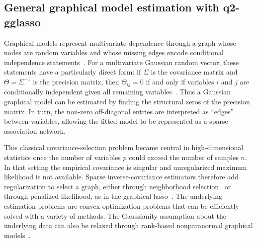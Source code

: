 \documentclass[11pt,a4paper]{article}
\newcommand{\pkg}[1]{\textbf{#1}}
\begin{document}
\clearpage

\subsection{General graphical model estimation with \pkg{q2-gglasso}}
\label{sec:graphical}

Graphical models represent multivariate dependence through a graph whose nodes
are random variables and whose missing edges encode conditional independence
statements~\citep{lauritzen1996graphical}. For a multivariate Gaussian random
vector, these statements have a particularly direct form: if $\Sigma$ is the
covariance matrix and $\Theta=\Sigma^{-1}$ is the precision matrix, then
$\Theta_{ij}=0$ if and only if variables $i$ and $j$ are conditionally
independent given all remaining variables~\citep{dempster1972covariance}. Thus a
Gaussian graphical model can be estimated by finding the structural zeros of the
precision matrix. In turn, the non-zero off-diagonal entries are interpreted as
``edges'' between variables, allowing the fitted model to be represented as a
sparse association network.

This classical covariance-selection problem became central in high-dimensional
statistics once the number of variables $p$ could exceed the number of samples
$n$. In that setting the empirical covariance is singular and unregularized
maximum likelihood is not available. Sparse inverse-covariance estimators
therefore add regularization to select a graph, either through neighborhood
selection~\citep{meinshausen2006high} or through penalized likelihood, as in the
graphical lasso~\citep{yuan2007model,banerjee2008model,friedman2008sparse}. The 
underlying estimation problems are convex optimization problems that can be
efficiently solved with a variety of methods. The Gaussianity assumption about
the underlying data can also be relaxed through rank-based nonparanormal
graphical models~\citep{xue2012regularized}.
\end{document}
